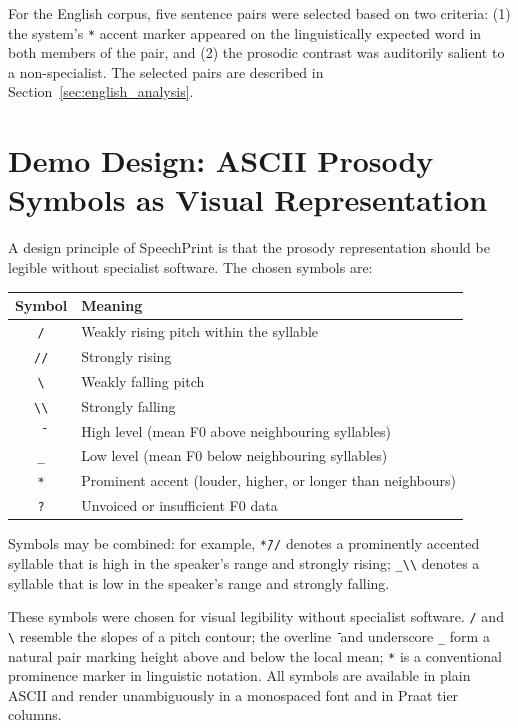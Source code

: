 For the English corpus, five sentence pairs were selected based on two
criteria: (1) the system's \texttt{*} accent marker appeared on the
linguistically expected word in both members of the pair, and (2) the prosodic
contrast was auditorily salient to a non-specialist. The selected pairs are
described in Section~\ref{sec:english_analysis}.

\section{Demo Design: ASCII Prosody Symbols as Visual Representation}
\label{sec:demo_design}

A design principle of SpeechPrint is that the prosody representation should be
legible without specialist software. The chosen symbols are:

\begin{center}
\begin{tabular}{cl}
\hline
Symbol & Meaning \\
\hline
\texttt{/}  & Weakly rising pitch within the syllable \\
\texttt{//} & Strongly rising \\
\texttt{\textbackslash}  & Weakly falling pitch \\
\texttt{\textbackslash\textbackslash} & Strongly falling \\
\texttt{{\={}}} & High level (mean F0 above neighbouring syllables) \\
\texttt{\_} & Low level (mean F0 below neighbouring syllables) \\
\texttt{*}  & Prominent accent (louder, higher, or longer than neighbours) \\
\texttt{?}  & Unvoiced or insufficient F0 data \\
\hline
\end{tabular}
\end{center}

Symbols may be combined: for example, \texttt{*{\={}}//} denotes a prominently
accented syllable that is high in the speaker's range and strongly rising; \texttt{\_\textbackslash\textbackslash}
denotes a syllable that is low in the speaker's range and strongly falling.

These symbols were chosen for visual legibility without specialist software.
\texttt{/} and \texttt{\textbackslash} resemble the slopes of a pitch contour;
the overline \texttt{{\={}}} and underscore \texttt{\_} form a natural pair
marking height above and below the local mean; \texttt{*} is a conventional
prominence marker in linguistic notation. All symbols are available in plain
ASCII and render unambiguously in a monospaced font and in Praat tier columns.

